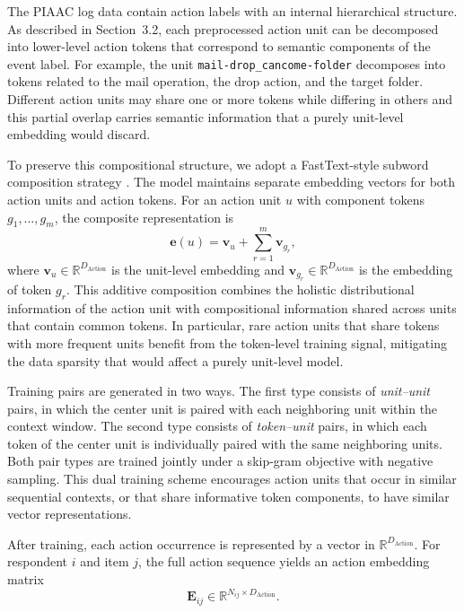\documentclass[A4paper,11pt]{article}
\begin{document}
The PIAAC log data contain action labels with an internal hierarchical structure. As described in Section~3.2, each preprocessed action unit can be decomposed into lower-level action tokens that correspond to semantic components of the event label. For example, the unit \texttt{mail-drop\_cancome-folder} decomposes into tokens related to the mail operation, the drop action, and the target folder. Different action units may share one or more tokens while differing in others and this partial overlap carries semantic information that a purely unit-level embedding would discard.

To preserve this compositional structure, we adopt a FastText-style subword composition strategy \citep{bojanowski2017enriching}. The model maintains separate embedding vectors for both action units and action tokens. For an action unit $u$ with component tokens $g_1,\ldots,g_m$, the composite representation is
\[
\mathbf{e}(u)
= \mathbf{v}_{u}+\sum_{r=1}^{m}\mathbf{v}_{g_r},
\]
where $\mathbf{v}_{u}\in\mathbb{R}^{D_{\mathrm{Action}}}$ is the unit-level embedding and $\mathbf{v}_{g_r}\in\mathbb{R}^{D_{\mathrm{Action}}}$ is the embedding of token $g_r$. This additive composition combines the holistic distributional information of the action unit with compositional information shared across units that contain common tokens. In particular, rare action units that share tokens with more frequent units benefit from the token-level training signal, mitigating the data sparsity that would affect a purely unit-level model.

Training pairs are generated in two ways. The first type consists of \emph{unit--unit} pairs, in which the center unit is paired with each neighboring unit within the context window. The second type consists of \emph{token--unit} pairs, in which each token of the center unit is individually paired with the same neighboring units. Both pair types are trained jointly under a skip-gram objective with negative sampling. This dual training scheme encourages action units that occur in similar sequential contexts, or that share informative token components, to have similar vector representations.

After training, each action occurrence is represented by a vector in $\mathbb{R}^{D_{\mathrm{Action}}}$. For respondent $i$ and item $j$, the full action sequence yields an action embedding matrix
\[
\mathbf{E}_{ij}\in\mathbb{R}^{N_{ij}\times D_{\mathrm{Action}}}.
\]
\end{document}
